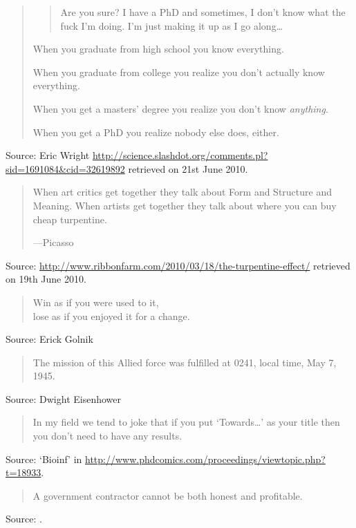 \documentclass[a4paper]{article}
\begin{document}
\begin{quote}
	\begin{quote}
		Are you sure? I have a PhD and sometimes, I don't know
		what the fuck I'm doing. I'm just making it up as I
		go along\ldots
	\end{quote}

	When you graduate from high school you know everything.

	When you graduate from college you realize you don't actually know everything.

	When you get a masters' degree you realize you don't know \emph{anything}.

	When you get a PhD you realize nobody else does, either.
\end{quote}
Source: Eric Wright \url{http://science.slashdot.org/comments.pl?sid=1691084&cid=32619892}
retrieved on 21st June 2010.
\medskip

\begin{quote}
	When art critics get together they talk about Form and Structure
	and Meaning.  When artists get together they talk about where
	you can buy cheap turpentine.

	---Picasso
\end{quote}
Source: \url{http://www.ribbonfarm.com/2010/03/18/the-turpentine-effect/} retrieved on 19th June 2010.
\medskip

\begin{quote}
	Win as if you were used to it,\\
	lose as if you enjoyed it for a change.
\end{quote}
Source: Erick Golnik
\medskip

\begin{quote}
	The mission of this Allied force was fulfilled at 0241, local time, May 7, 1945.
\end{quote}
Source: Dwight Eisenhower
\medskip

\begin{quote}
	In my field we tend to joke that if you put `Towards\ldots' as your
	title then you don't need to have any results. 
\end{quote}
Source: `Bioinf' in \url{http://www.phdcomics.com/proceedings/viewtopic.php?t=18933}.
\medskip

\begin{quote}
	A government contractor cannot be both honest and profitable.
\end{quote}
Source: \citet[p.~201]{Dequasie1991}.
\medskip
\end{document}
